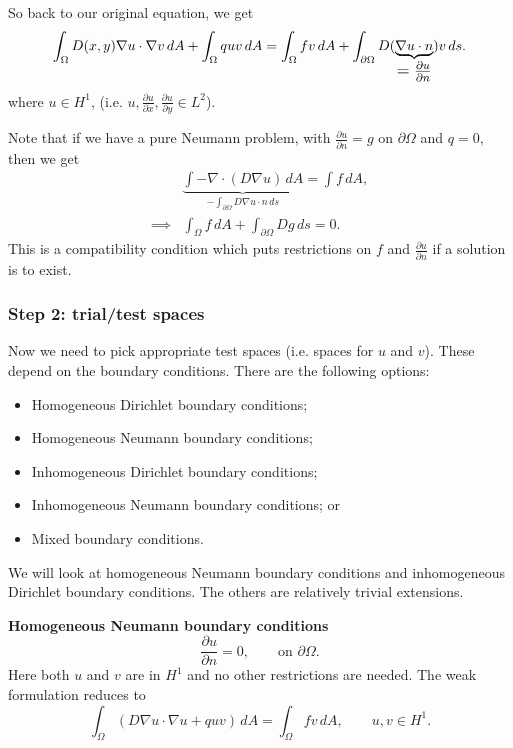 \documentclass[12pt, a4paper]{article}
\theoremstyle{definition}
\theoremstyle{remark}
\numberwithin{equation}{section}
\begin{document}
So back to our original equation, we get
\begin{align*}
\int_\Omega D(x,y)\nabla u \cdot \nabla v \, dA +\int_\Omega quv \, dA = \int_\Omega fv \, dA + \int_{\partial \Omega} D(\underbrace{\nabla u\cdot n}_{\mbox{\large$=\frac{\partial u}{\partial n}$}})v\, ds.
\end{align*}
where $u \in H^1$,  (i.e. $u,\frac{\partial u}{\partial x},\frac{\partial u}{\partial y} \in L^2$).

Note that if we have a pure Neumann problem, with $\frac{\partial u}{\partial n}=g$ on $\partial \Omega$ and $q=0$, then 
we get
\begin{align*}
&\underbrace{\int-\nabla\cdot(D \nabla u)\, dA}_{\mbox{$-\int_{\partial \Omega} D \nabla u \cdot n \, ds$}} = \int f \, dA,\\
\implies & \int_{\Omega}f \, dA + \int_{\partial\Omega} D g \, ds =0.
\end{align*}
This is a compatibility condition which puts restrictions on $f$ and $\frac{\partial u}{\partial n}$ if a solution is to exist.

\newpage
\subsubsection{Step 2: trial/test spaces}
Now we need to pick appropriate test spaces (i.e. spaces for $u$ and $v$). These depend on the boundary conditions. There are the following options:
\begin{itemize}
\item Homogeneous Dirichlet boundary conditions;
\item Homogeneous Neumann boundary conditions;
\item Inhomogeneous Dirichlet boundary conditions;
\item Inhomogeneous Neumann boundary conditions; or
\item Mixed boundary conditions.
\end{itemize}
We will look at homogeneous Neumann boundary conditions and inhomogeneous Dirichlet boundary conditions. The others are relatively trivial extensions.

\vspace{0.5cm}
{\bf Homogeneous Neumann boundary conditions}
\begin{equation*}
\frac{\partial u}{\partial n}=0, \qquad \mbox{on $\partial \Omega$}.
\end{equation*}
Here both $u$ and $v$ are in $H^{1}$ and no other restrictions are needed. The weak formulation reduces to
\begin{equation*}
\int_\Omega (D \nabla u \cdot \nabla u +quv) \, dA = \int_\Omega fv \, dA, \qquad u,v \in H^1.
\end{equation*}
\end{document}
